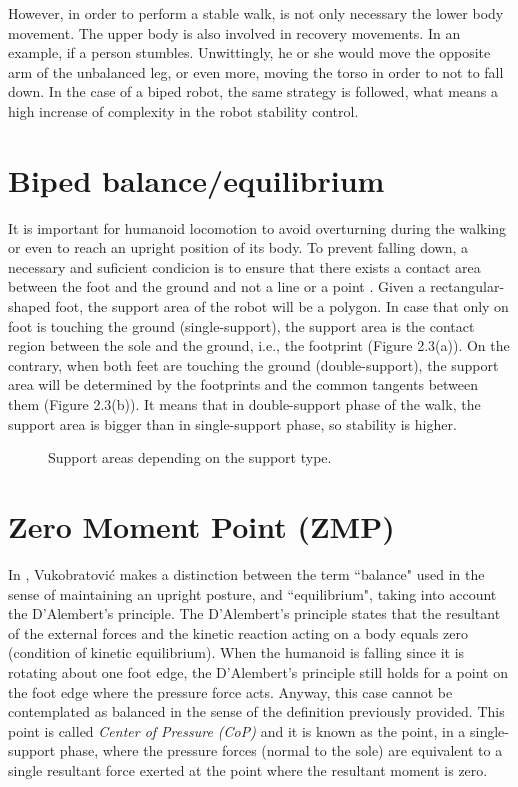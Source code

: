 However, in order to perform a stable walk, is not only necessary the lower body movement. The upper body is also involved in recovery movements. In an example, if a person stumbles. Unwittingly, he or she would move the opposite arm of the unbalanced leg, or even more, moving the torso in order to not to fall down. In the case of a biped robot, the same strategy is followed, what means a high increase of complexity in the robot stability control.

\section{Biped balance/equilibrium}
It is important for humanoid locomotion to avoid overturning during the walking or even to reach an upright position of its body. To prevent falling down, a necessary and suficient condicion is to ensure that there exists a contact area between the foot and the ground and not a line or a point \cite{Vuk2007}. Given a rectangular-shaped foot, the support area of the robot will be a polygon. In case that only on foot is touching the ground (single-support), the support area is the contact region between the sole and the ground, i.e., the footprint (Figure 2.3(a)). On the contrary, when both feet are touching the ground (double-support), the support area will be determined by the footprints and the common tangents between them (Figure 2.3(b)). It means that in double-support phase of the walk, the support area is bigger than in single-support phase, so stability is higher.

\begin{figure}[!hbt]
\centering
{}
\hspace{10mm}
\caption{Support areas depending on the support type.}
\label{fig:apoyo}
\end{figure}


\section{Zero Moment Point (ZMP)}
In \cite{Vuk2007}, Vukobratović makes a distinction between the term ``balance" used in the sense of maintaining an upright posture, and ``equilibrium", taking into account the D'Alembert's principle. The D'Alembert's principle states that the resultant of the external forces and the kinetic reaction acting on a body equals zero (condition of kinetic equilibrium). When the humanoid is falling since it is rotating about one foot edge, the D’Alembert’s principle still holds for a point on the foot edge where the pressure force acts. Anyway, this case cannot be contemplated as balanced in the sense of the definition previously provided. This point is called \textit{Center of Pressure (CoP)} and it is known as the point, in a single-support phase, where the pressure forces (normal to the sole) are equivalent to a single resultant force exerted at the point where the resultant moment is zero.

